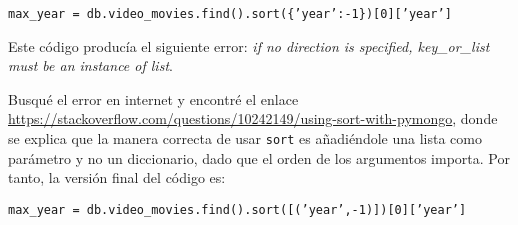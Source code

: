 \documentclass{article}
\begin{document}
\vspace{-1mm}
\begin{center}
  \texttt{max\_year = db.video\_movies.find().sort(\{'year':-1\})[0]['year']}
\end{center}

Este código producía el siguiente error: \textit{if no direction is specified, key\_or\_list must be an instance of list}.

Busqué el error en internet y encontré el enlace \href{https://stackoverflow.com/questions/10242149/using-sort-with-pymongo}{https://stackoverflow.com/questions/10242149/using-sort-with-pymongo}, donde se explica que la manera correcta de usar \texttt{sort} es añadiéndole una lista como parámetro y no un diccionario, dado que el orden de los argumentos importa. Por tanto, la versión final del código es:
\vspace{-1mm}
\begin{center}
  \texttt{max\_year = db.video\_movies.find().sort([('year',-1)])[0]['year']}
\end{center}
\end{document}
